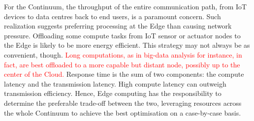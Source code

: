 
For the Continuum, the throughput of the entire communication path, from IoT devices to data centres back to end users, is a paramount concern. Such realization suggests preferring processing at the Edge than causing network pressure. 
Offloading some compute tasks from IoT sensor or actuator nodes to the Edge is likely to be more energy efficient. 
This strategy may not always be as convenient, though. \textcolor{red}{Long computations, as in big-data analysis for instance, in fact, are best offloaded to a more capable but distant node, possibly up to the center of the Cloud.}
Response time is the sum of two components: the compute latency and the transmission latency. High compute latency can outweigh transmission efficiency. 
Hence, Edge computing has the responsibility to determine the preferable trade-off between the two, leveraging resources across the whole Continuum to achieve the best optimisation on a case-by-case basis.

